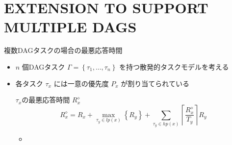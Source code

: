
\section{EXTENSION TO SUPPORT MULTIPLE DAGS}
\label{sec: EXTENSION TO SUPPORT MULTIPLE DAGS}

\begin{frame}{複数DAGタスクの場合の最悪応答時間}
    \begin{itemize}
        \item $n$ 個DAGタスク $\Gamma=\left\{\tau_{1}, \ldots, \tau_{n}\right\}$ を持つ散発的タスクモデルを考える
        \item 各タスク $\tau_{x}$ には一意の優先度 $P_{x}$ が割り当てられている
              \begin{block}{$\tau_{x}$の最悪応答時間 $R_{x}^{\diamond}$}
                  \begin{equation*}
                      R_{x}^{\diamond}=R_{x}+\max _{\tau_{y} \in l p(x)}\left\{R_{y}\right\}+\sum_{\tau_{y} \in h p(x)}\left\lceil\frac{R_{x}^{\diamond}}{T_{y}}\right\rceil R_{y}
                  \end{equation*}
                  \setlength{\linewidth}{0.98\columnwidth}
                  \begin{itemize}
                      \item {}
                  \end{itemize}
              \end{block}
    \end{itemize}
\end{frame}


